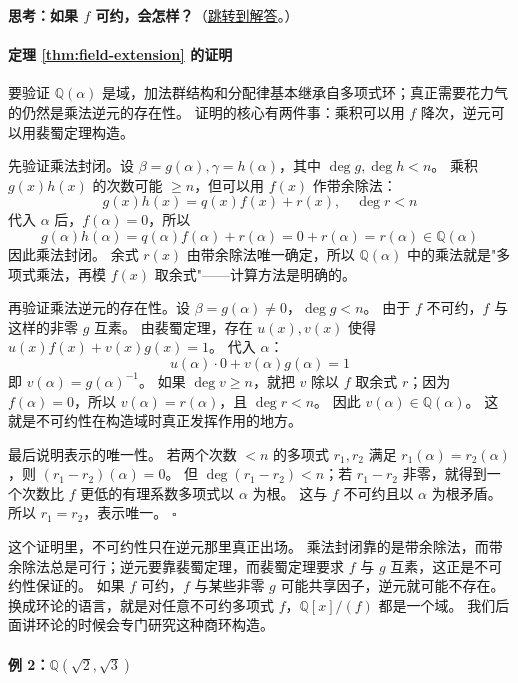 \hypertarget{q:reducible-polynomial}{}
\medskip
\noindent\textbf{思考：如果 $f$ 可约，会怎样？}（\hyperlink{ans:reducible-polynomial}{跳转到解答}。）
\medskip

\paragraph*{定理 \ref{thm:field-extension} 的证明}
要验证 $\mathbb{Q}(\alpha)$ 是域，加法群结构和分配律基本继承自多项式环；真正需要花力气的仍然是乘法逆元的存在性。
证明的核心有两件事：乘积可以用 $f$ 降次，逆元可以用裴蜀定理构造。

先验证乘法封闭。设 $\beta = g(\alpha), \gamma = h(\alpha)$，其中 $\deg g, \deg h < n$。
乘积 $g(x)h(x)$ 的次数可能 $\geq n$，但可以用 $f(x)$ 作带余除法：
\[g(x)h(x) = q(x)f(x) + r(x), \quad \deg r < n\]
代入 $\alpha$ 后，$f(\alpha)=0$，所以
\[g(\alpha)h(\alpha) = q(\alpha)f(\alpha) + r(\alpha) = 0 + r(\alpha) = r(\alpha) \in \mathbb{Q}(\alpha)\]
因此乘法封闭。
余式 $r(x)$ 由带余除法唯一确定，所以 $\mathbb{Q}(\alpha)$ 中的乘法就是"多项式乘法，再模 $f(x)$ 取余式"——计算方法是明确的。

再验证乘法逆元的存在性。设 $\beta = g(\alpha) \neq 0$，$\deg g < n$。
由于 $f$ 不可约，$f$ 与这样的非零 $g$ 互素。
由裴蜀定理，存在 $u(x), v(x)$ 使得 $u(x)f(x) + v(x)g(x) = 1$。
代入 $\alpha$：
\[u(\alpha) \cdot 0 + v(\alpha)g(\alpha) = 1\]
即 $v(\alpha) = g(\alpha)^{-1}$。
如果 $\deg v \geq n$，就把 $v$ 除以 $f$ 取余式 $r$；因为 $f(\alpha)=0$，所以 $v(\alpha)=r(\alpha)$，且 $\deg r < n$。
因此 $v(\alpha) \in \mathbb{Q}(\alpha)$。
这就是不可约性在构造域时真正发挥作用的地方。

最后说明表示的唯一性。
若两个次数 $<n$ 的多项式 $r_1,r_2$ 满足 $r_1(\alpha)=r_2(\alpha)$，则 $(r_1-r_2)(\alpha)=0$。
但 $\deg(r_1-r_2)<n$；若 $r_1-r_2$ 非零，就得到一个次数比 $f$ 更低的有理系数多项式以 $\alpha$ 为根。
这与 $f$ 不可约且以 $\alpha$ 为根矛盾。
所以 $r_1=r_2$，表示唯一。
 $\square$

这个证明里，不可约性只在逆元那里真正出场。
乘法封闭靠的是带余除法，而带余除法总是可行；逆元要靠裴蜀定理，而裴蜀定理要求 $f$ 与 $g$ 互素，这正是不可约性保证的。
如果 $f$ 可约，$f$ 与某些非零 $g$ 可能共享因子，逆元就可能不存在。
换成环论的语言，就是对任意不可约多项式 $f$，$\mathbb{Q}[x]/(f)$ 都是一个域。
我们后面讲环论的时候会专门研究这种商环构造。

\paragraph*{例 2：$\mathbb{Q}(\sqrt{2}, \sqrt{3})$}


